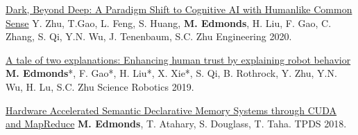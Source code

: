 


\begin{cvpublications}

\item \cvpublication
{\href{https://mjedmonds.com/papers/2020_dark_beyond_deep.pdf}{Dark, Beyond Deep: A Paradigm Shift to Cognitive AI with Humanlike Common Sense}} %
{Y. Zhu, T.Gao, L. Feng, S. Huang, \textbf{M. Edmonds}, H. Liu, F. Gao, C. Zhang, S. Qi, Y.N. Wu, J. Tenenbaum, S.C. Zhu} %
{Engineering 2020.} %
{} %

\item \cvpublication
{\href{http://robotics.sciencemag.org/cgi/content/full/4/37/eaay4663?ijkey=fn9h.cykmWa7.&keytype=ref&siteid=robotics}{A tale of two explanations: Enhancing human trust by explaining robot behavior}} %
{\textbf{M. Edmonds}*, F. Gao*, H. Liu*, X. Xie*, S. Qi, B. Rothrock, Y. Zhu, Y.N. Wu, H. Lu, S.C. Zhu} %
{Science Robotics 2019.} %
{} %

\item \cvpublication
{\href{http://www.mjedmonds.com/projects/DM/TPDS18_HADM_final.pdf}{Hardware Accelerated Semantic Declarative Memory Systems through CUDA and MapReduce}} %
{\textbf{M. Edmonds}, T. Atahary, S. Douglass, T. Taha.} %
{TPDS 2018.} %
{} %

\cvequalcontribution

\end{cvpublications}